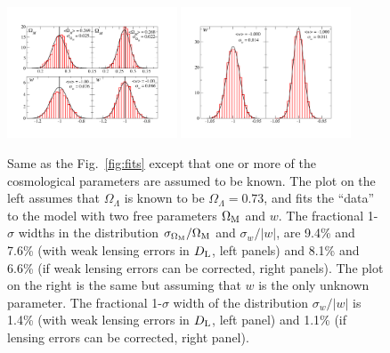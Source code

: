 \begin{figure}[t]
\centering
 \includegraphics[width=0.45\textwidth]{./Sec_ET_ScienceCase/2params_combined.pdf}
 \includegraphics[width=0.45\textwidth]{./Sec_ET_ScienceCase/1params.pdf}
\caption{Same as the Fig.~\ref{fig:fits} except
that one or more of the cosmological parameters are assumed to be
known.  The plot on the left assumes that $\Omega_\Lambda$ is
known to be $\Omega_\Lambda=0.73$, and fits the ``data'' to the 
model with two free parameters $\Omega_{\rm M}$ and $w.$
The fractional 1-$\sigma$ widths in the distribution
$\sigma_{\Omega_{\rm M}}/\Omega_{\rm M}$ and $\sigma_w/|w|$,
are 9.4\% and 7.6\% (with weak lensing errors in $D_{\rm L}$,
left panels) and 8.1\% and 6.6\% (if weak lensing errors
can be corrected, right panels). The plot on the
right is the same but assuming that $w$ is the
only unknown parameter.  The fractional 1-$\sigma$ width of the
distribution $\sigma_w/|w|$ is 1.4\% (with weak lensing errors
in $D_{\rm L}$, left panel) and 1.1\% (if lensing errors can be
corrected, right panel).}
\label{fig:fits2}
\end{figure}



